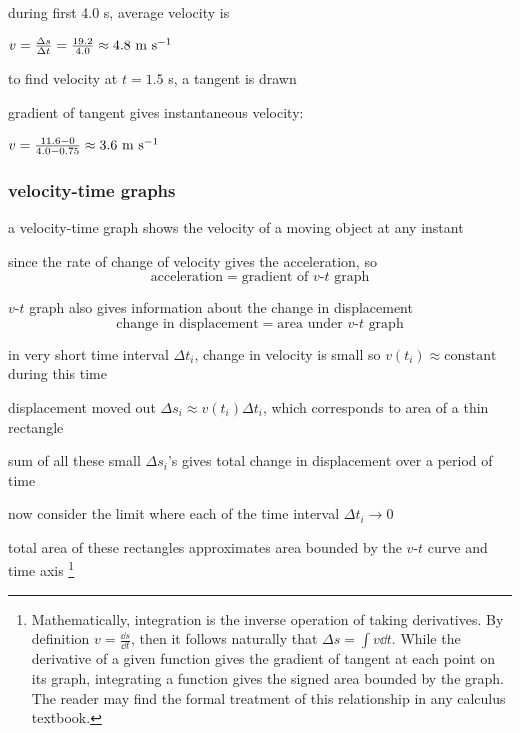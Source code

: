\sol during first 4.0 s, average velocity is

{
	\centering
	
	$ v = \frac{\Delta s}{\Delta t} = \frac{19.2}{4.0} \approx 4.8 \text{ m s$^{-1}$}$
	
}

to find velocity at $t=1.5$ s, a tangent is drawn

gradient of tangent gives instantaneous velocity:

{
	\centering
	
	$ v = \frac{11.6 - 0}{4.0-0.75} \approx 3.6 \text{ m s$^{-1}$} $
	
}

\vspace*{-\baselineskip} \eoe

\subsubsection{velocity-time graphs}

a velocity-time graph shows the velocity of a moving object at any instant

\cmt since the rate of change of velocity gives the acceleration, so
\begin{equation*}
\boxed{\text{acceleration} = \text{gradient of $v$-$t$ graph}}
\end{equation*}

\cmt $v$-$t$ graph also gives information about the change in displacement
\begin{equation*}
\boxed{\text{change in displacement} = \text{area under $v$-$t$ graph}}
\end{equation*}

in very short time interval $\Delta t_i$, change in velocity is small so $v(t_i)\approx\text{constant}$ during this time

displacement moved out $\Delta s_i \approx v(t_i) \Delta t_i$, which corresponds to area of a thin rectangle

sum of all these small $\Delta s_i$'s gives total change in displacement over a period of time

now consider the limit where each of the time interval $\Delta t_i \to 0$

total area of these rectangles approximates area bounded by the $v$-$t$ curve and time axis
\footnote{Mathematically, integration is the inverse operation of taking derivatives. By definition $v=\frac{\dd s}{\dd t}$, then it follows naturally that $\Delta s = \int v\dd t$. While the derivative of a given function gives the gradient of tangent at each point on its graph, integrating a function gives the signed area bounded by the graph. The reader may find the formal treatment of this relationship in any calculus textbook.}

